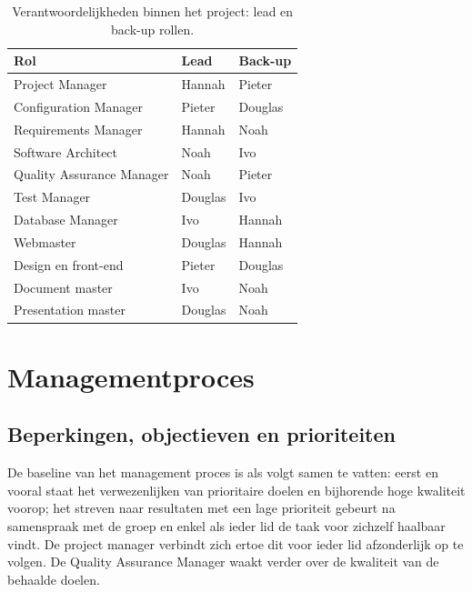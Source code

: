 \documentclass{article}
\begin{document}
\begin{table}[!h] 
  \begin{center}
    \begin{tabular}{| l || l | l |} 
      \hline
       {\bf Rol } &  {\bf Lead} &  {\bf  Back-up}  \\
      \hline
      Project Manager & Hannah & Pieter  \\
      \hline
      Configuration Manager & Pieter &  Douglas \\
      \hline
      Requirements Manager & Hannah & Noah \\
      \hline
      Software Architect & Noah & Ivo  \\
      \hline
      Quality Assurance Manager & Noah &  Pieter \\
      \hline
      Test Manager & Douglas &  Ivo \\
      \hline
       Database Manager & Ivo & Hannah  \\
      \hline
       Webmaster & Douglas & Hannah \\
      \hline
     Design en front-end & Pieter & Douglas \\
      \hline
       Document master & Ivo & Noah   \\
      \hline
        Presentation master & Douglas & Noah \\
      \hline
    \end{tabular}
  \end{center}
  \caption{Verantwoordelijkheden binnen het project: lead en back-up rollen.}
  \label{rolverdeling}
 \end{table}








\section{Managementproces}


\subsection{Beperkingen, objectieven en prioriteiten}

\noindent De baseline van het management proces is als volgt samen te vatten: eerst en vooral staat het verwezenlijken van prioritaire doelen en bijhorende hoge kwaliteit voorop; het streven naar resultaten met een lage prioriteit gebeurt na samenspraak met de groep en enkel als ieder lid de taak voor zichzelf haalbaar vindt. De project manager verbindt zich ertoe dit voor ieder lid afzonderlijk op te volgen. De Quality Assurance Manager waakt verder over de kwaliteit van de behaalde doelen. 
\end{document}
